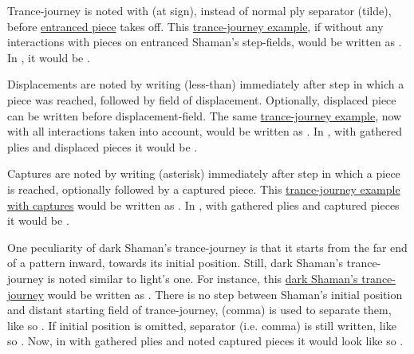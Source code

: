 Trance-journey is noted with  (at sign), instead of normal ply separator \alg{\~{}}
(tilde), before \hyperref[fig:scn_cot_42_entrancement_step]{entranced piece} takes off. This
\hyperref[fig:scn_cot_56_light_light_shaman_interaction_start]{trance-journey example},
if without any interactions with pieces on entranced Shaman's step-fields, would be written
as . In , it would be .

Displacements are noted by writing \alg{<} (less-than) immediately after step in which a
piece was reached, followed by field of displacement. Optionally, displaced piece can be
written before displacement-field. The same
\hyperref[fig:scn_cot_57_light_light_shaman_interaction_end]{trance-journey example},
now with all interactions taken into account, would be written as
.
In , with gathered plies and displaced pieces it would be \newline
{}.

Captures are noted by writing \alg{*} (asterisk) immediately after step in which a piece
is reached, optionally followed by a captured piece. This
\hyperref[fig:scn_cot_59_dark_light_shaman_interaction_end]{trance-journey example with captures}
would be written as \newline
{}. In , with gathered plies and
captured pieces it would be \newline
{}.

One peculiarity of dark Shaman's trance-journey is that it starts from the far end
of a pattern inward, towards its initial position. Still, dark Shaman's trance-journey
is noted similar to light's one. For instance, this
\hyperref[fig:scn_cot_60_dark_dark_shaman_interaction_start]{dark Shaman's trance-journey}
would be written as .
There is no step between Shaman's initial position and distant starting field of
trance-journey, \alg{,} (comma) is used to separate them, like so
.
If initial position is omitted, separator (i.e. comma) is still written, like so
. Now, in  with gathered plies
and noted captured pieces it would look like so \newline
{}.

